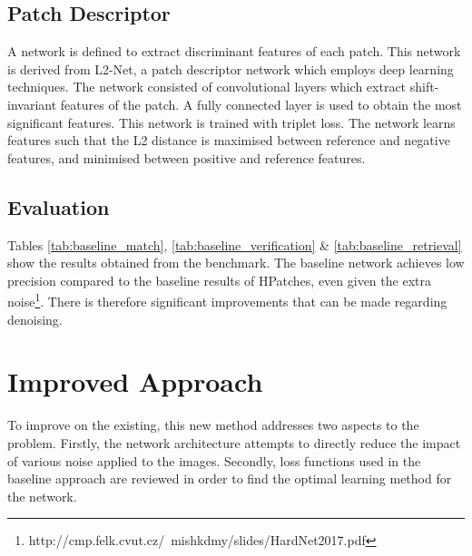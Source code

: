 \documentclass[10pt,twocolumn,letterpaper]{article}
\begin{document}
\vspace{-0.2cm}
\subsection{Patch Descriptor}
\vspace{-0.2cm}
A network is defined to extract discriminant features of each patch. This network is derived from L2-Net, a patch descriptor network which employs deep learning techniques.
The network consisted of convolutional layers which extract shift-invariant features of the patch. A fully connected layer is used to obtain the most significant features. This network is trained with triplet loss. The network learns features such that the L2 distance is maximised between reference and negative features, and minimised between positive and reference features.

\vspace{-0.2cm}
\subsection{Evaluation}
\vspace{-0.2cm}
Tables \ref{tab:baseline_match}, \ref{tab:baseline_verification} \& \ref{tab:baseline_retrieval} show the results obtained from the benchmark.
The baseline network achieves low precision compared to the baseline results of HPatches, even given the extra noise\footnote{http://cmp.felk.cvut.cz/~mishkdmy/slides/HardNet2017.pdf}. There is therefore significant improvements that can be made regarding denoising.

\vspace{-0.2cm}
\section{Improved Approach}
\vspace{-0.2cm}

To improve on the existing, this new method addresses two aspects to the problem. Firstly, the network architecture attempts to directly reduce the impact of various noise applied to the images. Secondly, loss functions used in the baseline approach are reviewed in order to find the optimal learning method for the network. 

\end{document}
